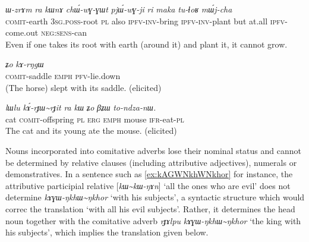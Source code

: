 \documentclass[oldfontcommands,oneside,a4paper,11pt]{article}
\newcommand{\ipa}[1]{{\phon\textit{#1}}} %
\newcommand{\tld}{\textasciitilde{}}
\begin{document}
\begin{exe}
\ex \label{ex:kAthAlwWlwa}
\gll \ipa{kɤ́-thɤlwɯ\tld{}lwa}  	\ipa{ɯ-zrɤm}  	\ipa{ra}  	\ipa{kɯnɤ}  	\ipa{chɯ́-wɣ-ɣɯt}  	\ipa{pjɯ́-wɣ-ji}  	\ipa{ri}  	\ipa{maka}  	\ipa{tu-ɬoʁ}  	\ipa{mɯ́j-cha}  \\
\textsc{comit}-earth \textsc{3sg.poss}-root \textsc{pl} also \textsc{ipfv-inv}-bring \textsc{ipfv-inv}-plant but at.all \textsc{ipfv}-come.out \textsc{neg:sens}-can \\
\glt Even if one takes its root with earth (around it) and plant it, it cannot grow.
\end{exe}


\begin{exe}
\ex \label{ex:kAsnWsno}
\gll \ipa{kɤ́-snɯ\tld{}sno}  	\ipa{ʑo}  	\ipa{kɤ-rŋgɯ}  \\
\textsc{comit}-saddle \textsc{emph} \textsc{pfv}-lie.down \\
\glt (The horse) slept with its saddle. (elicited)
\end{exe}

\begin{exe}
\ex \label{ex:kArJWrJit.kW}
\gll 
\ipa{lɯlu} 	\ipa{kɤ́-rɟɯ\tld{}rɟit} 	\ipa{ra} 	\ipa{kɯ} 	\ipa{ʑo} 	\ipa{βʑɯ} 	\ipa{to-ndza-nɯ.} \\
cat \textsc{comit}-offspring \textsc{pl}  \textsc{erg} \textsc{emph} mouse \textsc{ifr}-eat-\textsc{pl} \\
\glt The cat and its young ate the mouse. (elicited)
\end{exe}

Nouns incorporated into comitative adverbs lose their nominal status and cannot be determined by relative clauses (including attributive adjectives), numerals or demonstratives. In a sentence such as \ref{ex:kAGWNkhWNkhor} for instance, the attributive participial relative [\ipa{kɯ\tld{}kɯ-ŋɤn}] `all the ones who are evil' does not determine \ipa{kɤɣɯ-ŋkhɯ\tld{}ŋkhor} `with his subjects', a syntactic structure which would correc the translation `with all his evil subjects'. Rather, it determines the head noun together with the comitative adverb  \ipa{rɟɤlpu} \ipa{kɤɣɯ-ŋkhɯ\tld{}ŋkhor} `the king with his subjects', which implies the translation given below.
\end{document}
